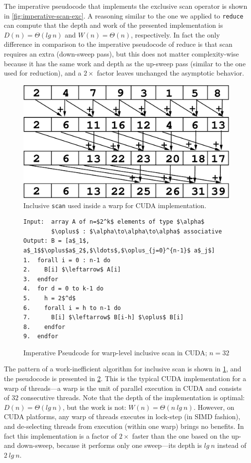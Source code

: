 \documentclass[acmsmall,review]{acmart}\settopmatter{printfolios=true,printccs=false,printacmref=false}
\begin{document}
The imperative pseudocode that implements the exclusive scan operator
is shown in \cref{fig:imperative-scan-exc}. A reasoning similar to the
one we applied to \lstinline{reduce} can compute that the depth and work
of the presented implementation is $D(n) = \Theta(lg \ n)$ and 
$W(n) = \Theta(n)$, respectively. In fact the only difference in
comparison to the imperative pseudocode of reduce is that scan
requires an extra (down-sweep pass), but this does not matter
complexity-wise because it has the same work and depth as the
up-sweep pass (similar to the one used for reduction), and
a $2\times$ factor leaves unchanged the asymptotic behavior.

\begin{figure}
\includegraphics[height=30ex]{Figures/L2/SgmScanEg.pdf} 
\caption{Inclusive \lstinline{scan} used inside a warp for CUDA implementation.}
\label{fig:scan-eg-warp}
\end{figure} 

\begin{figure}
\begin{lstlisting}[mathescape=true]
Input:  array A of n=$2^k$ elements of type $\alpha$
        $\oplus$ : $\alpha\to\alpha\to\alpha$ associative
Output: B = [a$_1$, a$_1$$\oplus$a$_2$,$\ldots$,$\oplus_{j=0}^{n-1}$ a$_j$]
1.  forall i = 0 : n-1 do
2.    B[i] $\leftarrow$ A[i]
3.  endfor
4.  for d = 0 to k-1 do
5.    h = 2$^d$
6.    forall i = h to n-1 do 
7.      B[i] $\leftarrow$ B[i-h] $\oplus$ B[i]
8.    endfor
9.  endfor
\end{lstlisting}\vspace{-4ex}
\caption{Imperative Pseudcode for warp-level inclusive scan in CUDA; $n=32$}
\label{fig:warp-scan-inc}
\end{figure}

The pattern of a work-inefficient algorithm for inclusive scan is shown
in \cref{fig:scan-eg-warp}, and the pseudocode is presented in 
\cref{fig:warp-scan-inc}. This is the typical CUDA implementation
for a warp of threads---a warp is the unit of parallel execution
in CUDA and consists of $32$ consecutive threads.  Note that
the depth of the implementation is optimal: $D(n) = \Theta(lg \ n)$,
but the work is not:  $W(n) = \Theta(n~lg~n)$. However, on CUDA
platforms, any warp of threads executes in lock-step (in SIMD fashion), 
and de-selecting threads from execution (within one warp) brings no 
benefits. In fact this implementation is a factor of $2\times$ faster
than the one based on the up- and down-sweep, because it performs
only one sweep---its depth is $lg~n$ instead of $2~lg~n$. 
\end{document}
